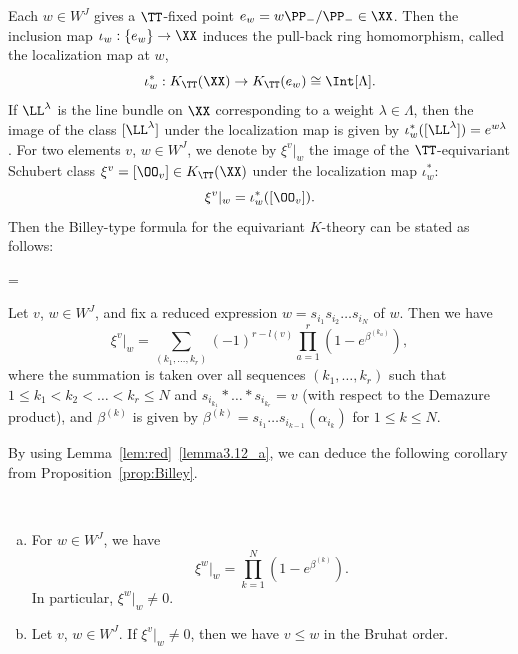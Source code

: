 Each $w \in W^J$ gives a $\TT$-fixed point $e_w = w \PP_-/\PP_- \in \XX$.
Then the inclusion map $\iota_w : \{ e_w \} \to \XX$ induces the pull-back ring homomorphism, 
called the localization map at $w$,
$$
\iota_w^* : K_{\TT}(\XX) \to K_{\TT}(e_w) \cong \Int[\Lambda].
$$
If $\LL^\lambda$ is the line bundle on $\XX$ corresponding to a weight $\lambda \in \Lambda$, 
then the image of the class $[\LL^\lambda]$ under the localization map is given by
$\iota_w^*( [\LL^\lambda] ) = e^{w \lambda}$.
For two elements $v$, $w \in W^J$, we denote by $\xi^v|_w$ 
the image of the $\TT$-equivariant Schubert class $\xi^v = [\OO_v] \in K_{\TT}(\XX)$ 
under the localization map $\iota_w^*$:
$$
\xi^v|_w = \iota_w^* ( [\OO_v] ).
$$
Then the Billey-type formula for the equivariant $K$-theory can be stated as follows:

\setbox\toto=\hbox {\cite[Proposition~2.10]{LSS}}
\begin{prop}[\box\toto]
\label{prop:Billey}
Let $v$, $w \in W^J$, and fix a reduced expression $w = s_{i_1} s_{i_2} \dots s_{i_N}$ of $w$.
Then we have
\begin{equation}
\label{eq:Billey}
\xi^v|_w 
 =
\sum_{(k_1, \dots, k_r)}
 (-1)^{r-l(v)} \prod_{a=1}^r \left( 1 - e^{\beta^{(k_a)}} \right),
\end{equation}
where the summation is taken over all sequences $(k_1, \dots, k_r)$ 
such that $1 \le k_1 < k_2 < \dots < k_r \le N$ and $s_{i_{k_1}} * \dots * s_{i_{k_r}} = v$ 
(with respect to the Demazure product), 
and $\beta^{(k)}$ is given by $\beta^{(k)} = s_{i_1} \dots s_{i_{k-1}}(\alpha_{i_k})$ for $1 \le k \le N$.
\end{prop}

By using Lemma~\ref{lem:red}~\ref{lemma3.12_a}, we can deduce the following corollary from Proposition~\ref{prop:Billey}.

\begin{coro} \label{cor:Billey}\ 

\begin{enumerate}[(a)]
\item\label{coro4.2_a} %
For $w \in W^J$, we have
\begin{equation}
\label{eq:Billey2}
\xi^w|_w = \prod_{k=1}^N \left( 1 - e^{\beta^{(k)}} \right).
\end{equation}
In particular, $\xi^w|_w \neq 0$.
\item\label{coro4.2_b} %
Let $v$, $w \in W^J$.
If $\xi^v|_w \neq 0$, then we have $v \le w$ in the Bruhat order.
\end{enumerate}
\end{coro}

